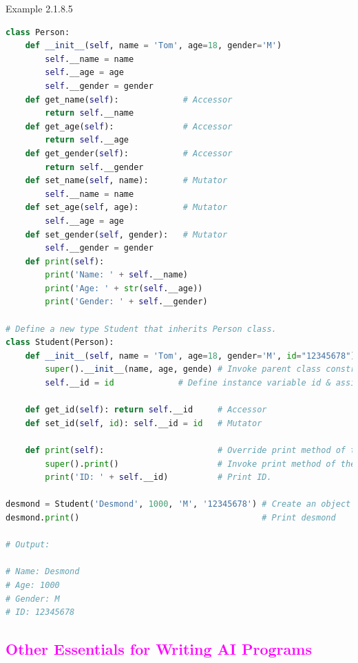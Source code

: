 \documentclass{book}
\begin{document}
    \begin{egBox}[]{Example 2.1.8.5}{}
    \begin{lstlisting}[language=Python, basicstyle=\ttfamily\small, keywordstyle=\color{blue}, commentstyle=\color{forestgreen}, stringstyle=\color{red}, showstringspaces=false]
class Person:
    def __init__(self, name = 'Tom', age=18, gender='M')
        self.__name = name
        self.__age = age
        self.__gender = gender
    def get_name(self):             # Accessor
        return self.__name
    def get_age(self):              # Accessor
        return self.__age
    def get_gender(self):           # Accessor
        return self.__gender
    def set_name(self, name):       # Mutator
        self.__name = name
    def set_age(self, age):         # Mutator
        self.__age = age
    def set_gender(self, gender):   # Mutator
        self.__gender = gender
    def print(self):
        print('Name: ' + self.__name)
        print('Age: ' + str(self.__age))
        print('Gender: ' + self.__gender)

# Define a new type Student that inherits Person class.
class Student(Person):
    def __init__(self, name = 'Tom', age=18, gender='M', id="12345678"): # Constructor
        super().__init__(name, age, gende) # Invoke parent class constructor.
        self.__id = id             # Define instance variable id & assign it with parameter.

    def get_id(self): return self.__id     # Accessor
    def set_id(self, id): self.__id = id   # Mutator

    def print(self):                       # Override print method of the parent class.
        super().print()                    # Invoke print method of the parent class.
        print('ID: ' + self.__id)          # Print ID.

desmond = Student('Desmond', 1000, 'M', '12345678') # Create an object named desmond.
desmond.print()                                     # Print desmond

# Output:

# Name: Desmond
# Age: 1000
# Gender: M
# ID: 12345678
    \end{lstlisting}
    \end{egBox}
\textcolor{magenta}{\section{\textbf{Other Essentials for Writing AI Programs}}}
\end{document}
